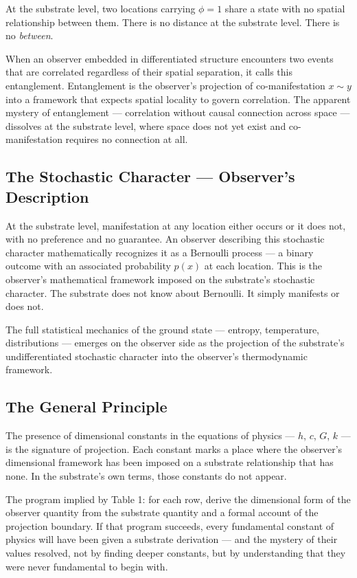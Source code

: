 \documentclass[11pt,letterpaper]{article}
\begin{document}
At the substrate level, two locations carrying \(\phi = 1\) share a state with no spatial relationship between them. There is no distance at the substrate level. There is no \emph{between}.

When an observer embedded in differentiated structure encounters two events that are correlated regardless of their spatial separation, it calls this entanglement. Entanglement is the observer's projection of co-manifestation \(x \sim y\) into a framework that expects spatial locality to govern correlation. The apparent mystery of entanglement --- correlation without causal connection across space --- dissolves at the substrate level, where space does not yet exist and co-manifestation requires no connection at all.
\subsection{The Stochastic Character --- Observer's Description}
\label{sec:orgd1257e7}

At the substrate level, manifestation at any location either occurs or it does not, with no preference and no guarantee. An observer describing this stochastic character mathematically recognizes it as a Bernoulli process --- a binary outcome with an associated probability \(p(x)\) at each location. This is the observer's mathematical framework imposed on the substrate's stochastic character. The substrate does not know about Bernoulli. It simply manifests or does not.

The full statistical mechanics of the ground state --- entropy, temperature, distributions --- emerges on the observer side as the projection of the substrate's undifferentiated stochastic character into the observer's thermodynamic framework.
\subsection{The General Principle}
\label{sec:org3060179}

The presence of dimensional constants in the equations of physics --- \(h\), \(c\), \(G\), \(k\) --- is the signature of projection. Each constant marks a place where the observer's dimensional framework has been imposed on a substrate relationship that has none. In the substrate's own terms, those constants do not appear.

The program implied by Table 1: for each row, derive the dimensional form of the observer quantity from the substrate quantity and a formal account of the projection boundary. If that program succeeds, every fundamental constant of physics will have been given a substrate derivation --- and the mystery of their values resolved, not by finding deeper constants, but by understanding that they were never fundamental to begin with.
\end{document}

